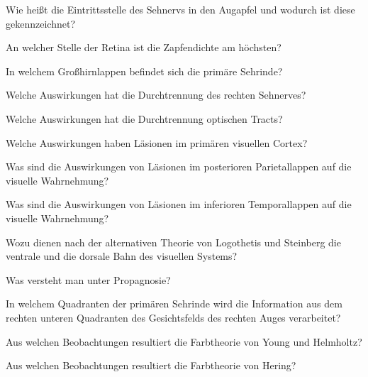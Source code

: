 \documentclass[10pt, a4paper]{exam}
\begin{document}
\begin{questions}
\begin{solution}
  \end{solution}
  \question Wie heißt die Eintrittsstelle des Sehnervs in den Augapfel und wodurch ist diese gekennzeichnet?
  \begin{solution}
  \end{solution}
  \question An welcher Stelle der Retina ist die Zapfendichte am höchsten?
  \begin{solution}
  \end{solution}
  \question In welchem Großhirnlappen befindet sich die primäre Sehrinde?
  \begin{solution}
  \end{solution}
  \question Welche Auswirkungen hat die Durchtrennung des rechten Sehnerves?
  \begin{solution}
  \end{solution}
  \question Welche Auswirkungen hat die Durchtrennung optischen Tracts?
  \begin{solution}
  \end{solution}
  \question Welche Auswirkungen haben Läsionen im primären visuellen Cortex?
  \begin{solution}
  \end{solution}
  \question Was sind die Auswirkungen von Läsionen im posterioren Parietallappen auf die visuelle Wahrnehmung?
  \begin{solution}
  \end{solution}
  \question Was sind die Auswirkungen von Läsionen im inferioren Temporallappen auf die visuelle Wahrnehmung?
  \begin{solution}
  \end{solution}
  \question Wozu dienen nach der alternativen Theorie von Logothetis und Steinberg die ventrale und die dorsale Bahn des visuellen Systems?
  \begin{solution}
  \end{solution}
  \question Was versteht man unter Propagnosie?
  \begin{solution}
  \end{solution}
  \question In welchem Quadranten der primären Sehrinde wird die Information aus dem rechten unteren Quadranten des Gesichtsfelds des rechten Auges verarbeitet?
  \begin{solution}
  \end{solution}
  \question Aus welchen Beobachtungen resultiert die Farbtheorie von Young und Helmholtz?
  \begin{solution}
  \end{solution}
  \question Aus welchen Beobachtungen resultiert die Farbtheorie von Hering?

\end{questions}
\end{document}

